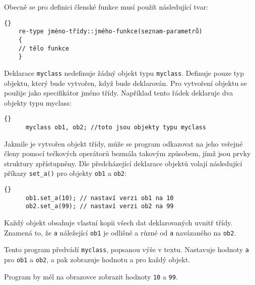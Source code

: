     Obecně se pro definici členské funkce musí použít následující tvar:
    \begin{lstlisting}{}
    re-type jméno-třídy::jmého-funkce(seznam-parametrů)
    {
    // tělo funkce
    }
    \end{lstlisting}
    Deklarace \lstinline[basicstyle=\ttfamily]!myclass! nedefinuje žádný objekt typu \lstinline[basicstyle=\ttfamily]!myclass!.
    Definuje pouze typ objektu, který bude vytvořen, když bude deklarován. Pro vytvoření objektu se použije jako specifikátor
    jméno třídy. Například tento řádek deklaruje dva objekty typu myclass:
    \begin{lstlisting}{}
      myclass ob1, ob2; //toto jsou objekty typu myclass
    \end{lstlisting}
    Jakmile je vytvořen objekt třídy, může se program odkazovat na jeho veřejné členy pomocí tečkových operátorů bezmála takovým
    způsobem, jímž jsou prvky struktury zpřístupněny. Dle předcházející deklarace objektů volají následující příkazy
    \lstinline[basicstyle=\ttfamily]!set_a()! pro objekty \lstinline[basicstyle=\ttfamily]!ob1! a
    \lstinline[basicstyle=\ttfamily]!ob2!:
    \begin{lstlisting}{}
      ob1.set_a(10); // nastaví verzi ob1 na 10
      ob2.set_a(99); // nastaví verzi ob2 na 99
    \end{lstlisting}
    Každý objekt obsahuje vlastní kopii všech dat deklarovaných uvnitř třídy. Znamená to, že \lstinline[basicstyle=\ttfamily]!a!
    náležející \lstinline[basicstyle=\ttfamily]!ob1! je odlišné a různé od \lstinline[basicstyle=\ttfamily]!a! navázaného na
    \lstinline[basicstyle=\ttfamily]!ob2!.

    \begin{example}
       Tento program předvádí \lstinline[basicstyle=\ttfamily]!myclass!, popsanou výše v textu. Nastavuje hodnoty
       \lstinline[basicstyle=\ttfamily]!a! pro \lstinline[basicstyle=\ttfamily]!ob1! a \lstinline[basicstyle=\ttfamily]!ob2!, a
       pak zobrazuje hodnotu a pro každý objekt.
       
       Program by měl na obrazovce zobrazit hodnoty \lstinline[basicstyle=\ttfamily]!10! a \lstinline[basicstyle=\ttfamily]!99!.
    \end{example}

